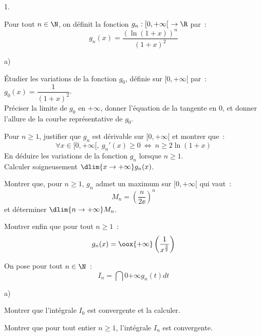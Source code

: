 \begin{noliste}{1.}
  \setlength{\itemsep}{2mm}
\item Pour tout $n \in \N$, on définit la fonction $g_n : [0,+\infty[
  \ \rightarrow \R$ par~:
  \[ 
  g_n(x) = \dfrac{( \ln(1+x))^n}{(1+x)^2} 
  \]

\begin{noliste}{a)}
\item Étudier les variations de la fonction $g_0$, définie sur 
$[0,+\infty[$ par~: $g_0(x) = \dfrac{1}{(1+x)^2}$.\\ 
Préciser la limite de $g_0$ en $+\infty$, donner l'équation de la 
tangente en $0$, et donner l'allure de la courbe représentative de 
$g_0$.








\item Pour $n \geq 1$, justifier que $g_n$ est dérivable sur
  $[0,+\infty[$ et montrer que~:
  \[ 
  \forall x \in [0,+\infty[, \ g_n'(x) \geq 0 \ \Leftrightarrow \ n
  \geq 2\ln(1+x)
  \]
  En déduire les variations de la fonction $g_n$ lorsque $n \geq 1$.\\ 
  Calculer soigneusement $\dlim{x \to + \infty} g_n(x)$.
  
  


\item Montrer que, pour $n \geq 1$, $g_n$ admet un maximum sur 
$[0,+\infty[$ qui vaut~:
\[ 
M_n = \left( \dfrac{n}{2 \ee} \right)^n 
\]
et déterminer $\dlim{n \to + \infty} M_n$.






\item Montrer enfin que pour tout $n \geq 1$~:
  \[
  g_n(x)  = \oox{+\infty} \left( 
    \frac{1}{x^{\frac{3}{2}}} \right) 
  \]

  
\end{noliste}


\newpage


\item On pose pour tout $n \in \N$~:
\[ 
I_n = \dint{0}{+\infty} g_n(t) dt 
\]
\begin{noliste}{a)}
\item Montrer que l'intégrale $I_0$ est convergente et la calculer.






\item Montrer que pour tout entier $n \geq 1$, l'intégrale $I_n$ 
est convergente.





\end{noliste}
\end{noliste}
